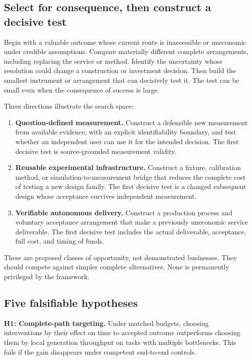 \documentclass[11pt,letterpaper]{article}
\theoremstyle{remark}\newtheorem{remark}{Remark}[section]
\begin{document}
\subsection{Select for consequence, then construct a decisive test}
Begin with a valuable outcome whose current route is inaccessible or uneconomic under credible assumptions.
Compare materially different complete arrangements, including replacing the service or method.
Identify the uncertainty whose resolution could change a construction or investment decision.
Then build the smallest instrument or arrangement that can decisively test it.
The test can be small even when the consequence of success is large.

Three directions illustrate the search space:
\begin{enumerate}
 \item \textbf{Question-defined measurement.}
 Construct a defensible new measurement from available evidence, with an explicit identifiability boundary, and test whether an independent user can use it for the intended decision.
 The first decisive test is source-grounded measurement validity.
 \item \textbf{Reusable experimental infrastructure.}
 Construct a fixture, calibration method, or simulation-to-measurement bridge that reduces the complete cost of testing a new design family.
 The first decisive test is a changed subsequent design whose acceptance survives independent measurement.
 \item \textbf{Verifiable autonomous delivery.}
 Construct a production process and voluntary acceptance arrangement that make a previously uneconomic service deliverable.
 The first decisive test includes the actual deliverable, acceptance, full cost, and timing of funds.
\end{enumerate}
These are proposed classes of opportunity, not demonstrated businesses.
They should compete against simpler complete alternatives.
None is permanently privileged by the framework.

\subsection{Five falsifiable hypotheses}
\textbf{H1: Complete-path targeting.}
Under matched budgets, choosing interventions by their effect on time to accepted outcome outperforms choosing them by local generation throughput on tasks with multiple bottlenecks.
This fails if the gain disappears under competent end-to-end controls.
\end{document}
